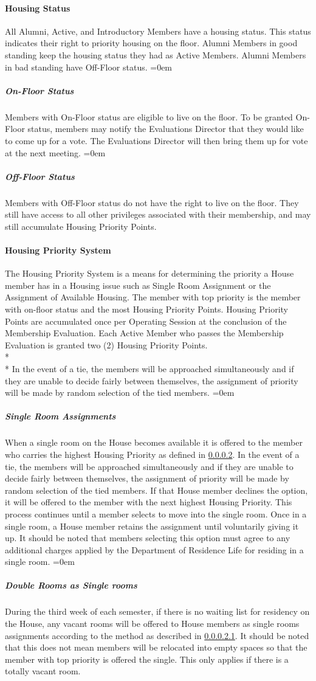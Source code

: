 \documentclass{article}
\newcommand{\asubsubsection}[1]{\paragraph{#1} \label{#1}}
\newcommand{\asubsubsubsection}[1]{\parindent=0em\subparagraph{#1} \label{#1}}
\begin{document}
\asubsubsection{Housing Status}
All Alumni, Active, and Introductory Members have a housing status.
This status indicates their right to priority housing on the floor.
Alumni Members in good standing keep the housing status they had as Active Members.
Alumni Members in bad standing have Off-Floor status.
\asubsubsubsection{On-Floor Status}
Members with On-Floor status are eligible to live on the floor.
To be granted On-Floor status, members may notify the Evaluations Director that they would like to come up for a vote.
The Evaluations Director will then bring them up for vote at the next meeting.
\asubsubsubsection{Off-Floor Status}
Members with Off-Floor status do not have the right to live on the floor.
They still have access to all other privileges associated with their membership, and may still accumulate Housing Priority Points.

\asubsubsection{Housing Priority System}
The Housing Priority System is a means for determining the priority a House member has in a Housing issue such as Single Room Assignment or the Assignment of Available Housing.
The member with top priority is the member with on-floor status and the most Housing Priority Points.
Housing Priority Points are accumulated once per Operating Session at the conclusion of the Membership Evaluation. Each Active Member who passes the Membership Evaluation is granted two (2) Housing Priority Points.
\\* \\*
In the event of a tie, the members will be approached simultaneously and if they are unable to decide fairly between themselves, the assignment of priority will be made by random selection of the tied members.
\asubsubsubsection{Single Room Assignments}
When a single room on the House becomes available it is offered to the member who carries the highest Housing Priority as defined in \ref{Housing Priority System}.
In the event of a tie, the members will be approached simultaneously and if they are unable to decide fairly between themselves, the assignment of priority will be made by random selection of the tied members.
If that House member declines the option, it will be offered to the member with the next highest Housing Priority.
This process continues until a member selects to move into the single room.
Once in a single room, a House member retains the assignment until voluntarily giving it up.
It should be noted that members selecting this option must agree to any additional charges applied by the Department of Residence Life for residing in a single room.
\asubsubsubsection{Double Rooms as Single rooms}
During the third week of each semester, if there is no waiting list for residency on the House, any vacant rooms will be offered to House members as single rooms assignments according to the method as described in \ref{Single Room Assignments}.
It should be noted that this does not mean members will be relocated into empty spaces so that the member with top priority is offered the single.
This only applies if there is a totally vacant room.
\end{document}
